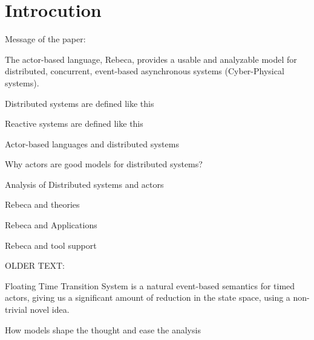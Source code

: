 \section{Introcution} \label{sec::introduction}

Message of the paper:

The actor-based language, Rebeca, provides a usable and analyzable model for distributed, concurrent, event-based asynchronous systems (Cyber-Physical systems).

Distributed systems  are defined like this

Reactive systems are defined like this

Actor-based languages and distributed systems

Why actors are good models for distributed systems?

Analysis of Distributed systems and actors

Rebeca and theories

Rebeca and Applications

Rebeca and tool support

OLDER TEXT:

Floating Time Transition System is a natural event-based semantics for timed actors, giving us a significant amount of reduction in the state space, using a non-trivial novel idea.
	
How models shape the thought and ease the analysis
